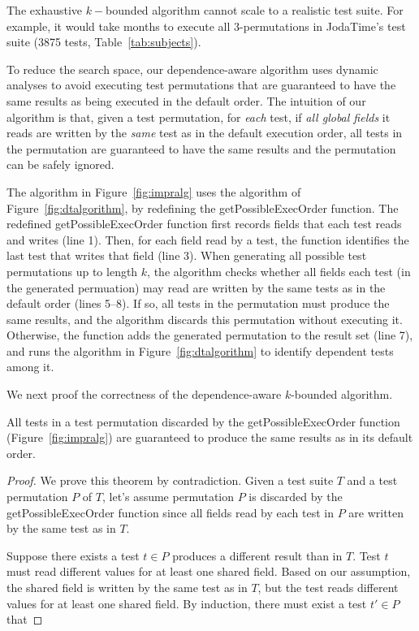 The exhaustive $k-$bounded algorithm cannot scale to a realistic test suite.
For example, it would take months to 
execute all 3-permutations
in JodaTime's test suite (3875 tests, Table~\ref{tab:subjects}).

To reduce the search space, our dependence-aware algorithm
uses dynamic analyses to avoid executing test
permutations that are guaranteed to have the
same results as being executed in the default order.
The intuition of our algorithm is that,
given a test permutation, for \textit{each}
test, if \textit{all global fields} it reads
are written by the \textit{same} test as
in the default execution order, all tests in
the permutation are guaranteed to
have the same results and the permutation can be safely ignored. 

The algorithm in Figure~\ref{fig:impralg} uses the
algorithm of Figure~\ref{fig:dtalgorithm}, by redefining
the getPossibleExecOrder function. The redefined
getPossibleExecOrder function first records
fields that each test reads and writes (line 1).
Then, for each field read by a test,
the function identifies the last test that writes
that field (line 3).
When generating all possible test permutations
up to length $k$, the algorithm checks whether
all fields each test (in the generated permuation)
may read are written by the same tests as in the
default order (lines 5--8). If so, all tests in the permutation
must produce the same results, and the algorithm discards
this permutation without executing it. Otherwise,
the function adds the generated permutation to the result
set (line 7), and runs the algorithm in Figure~\ref{fig:dtalgorithm}
to identify dependent tests among it.


We next proof the correctness of the dependence-aware
$k$-bounded algorithm.

\begin{theorem}
All tests in a test permutation discarded by the getPossibleExecOrder
function (Figure~\ref{fig:impralg}) are guaranteed to produce the same results as in its default order.
\end{theorem}

\begin{proof}
We prove this theorem by contradiction. Given a test
suite $T$ and a test permutation $P$ of $T$, let's assume
permutation $P$ is discarded by the getPossibleExecOrder function
since all fields read by each test in $P$ are written
by the same test as in $T$.


Suppose there exists a test $t \in P$ produces a different result
than in $T$. Test $t$ must read different values
for at least one shared field. Based on our assumption,
the shared field is written by the same test as in $T$,
but the test reads different values for at least
one shared field. By induction, there must exist
a test $t' \in P$ that 
\end{proof}

